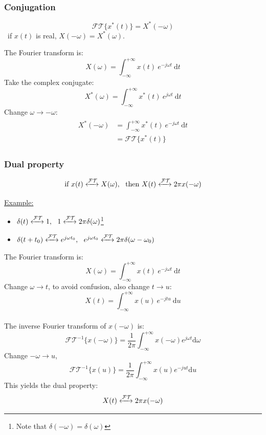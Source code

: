 \subsubsection{Conjugation}
\[ \mathcal{FT} \{ x^{*}(t)\} = X^{*}(-\omega) \]
\ if $x(t)$ is real, $X(-\omega) = X^{*}(\omega)$.
\begin{dv}{}
    The Fourier transform is:
    \[ X(\omega) =  \int_{-\infty}^{+\infty} x(t) \ e^{-j \omega t} \ \mathrm{d}t\] 
    Take the complex conjugate:
    \[ X^{*}(\omega) =  \int_{-\infty}^{+\infty} x^{*}(t) \ e^{j \omega t} \ \mathrm{d}t\] 
    Change $\omega \to -\omega$:
    \begin{align*}
    \begin{split} 
        X^{*}(-\omega) &=  \int_{-\infty}^{+\infty} x^{*}(t) \ e^{-j \omega t} \ \mathrm{d}t\\
        &= \mathcal{FT}\{ x^{*}(t)\}
    \end{split} 
    \end{align*}
\end{dv}

\subsubsection{Dual property}
\[ \text{if} \ x(t) \xleftrightarrow{\mathcal{FT}} X(\omega), \ \ \text{then} \ X(t) \xleftrightarrow{\mathcal{FT}} 2\pi x(-\omega) \]

\underline{Example:} 
\begin{itemize}
    \item $\delta(t) \xleftrightarrow{\mathcal{FT}} 1, \ \ 1 \xleftrightarrow{\mathcal{FT}} 2\pi\delta(\omega)$\footnote{Note that $\delta(-\omega)=\delta(\omega)$}
    \item $\delta(t+t_{0})\xleftrightarrow{\mathcal{FT}}e^{j\omega t_{0}}, \ \ e^{j\omega t_{0}} \xleftrightarrow{\mathcal{FT}} 2\pi \delta(\omega-\omega_{0})$
\end{itemize}

\begin{dv}{}
    The Fourier transform is:
    \[ X(\omega) =  \int_{-\infty}^{+\infty} x(t) \ e^{-j \omega t} \ \mathrm{d}t\] 
    Change $\omega \to t$, to avoid confusion, also change $t \to u$:
    \[ X(t) =  \int_{-\infty}^{+\infty} x(u) \ e^{-j t u} \ \mathrm{d}u \] \ \\
    The inverse Fourier transform of $x(-\omega)$ is:
    \[ \mathcal{FT}^{-1} \{ x(-\omega) \} = \frac{1}{2\pi} \int_{-\infty}^{+\infty} x(-\omega)e^{j \omega t} \mathrm{d}\omega \]
    Change $-\omega \to u$,
    \[ \mathcal{FT}^{-1} \{ x(u) \} = \frac{1}{2\pi} \int_{-\infty}^{+\infty} x(u)e^{-jut} \mathrm{d}u \]
    This yields the dual property:
    \[ X(t) \xleftrightarrow{\mathcal{FT}} 2\pi x(-\omega) \]
\end{dv}

